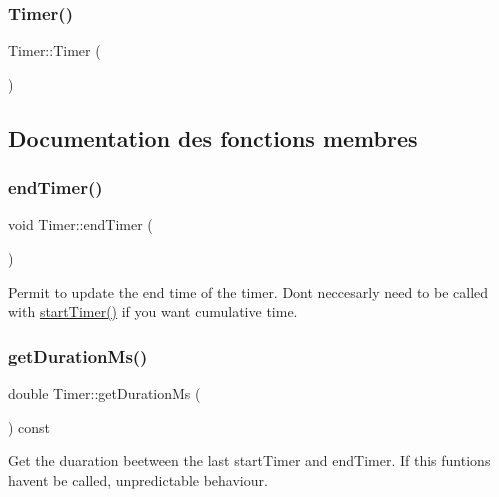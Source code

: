 \subsubsection{\texorpdfstring{Timer()}{Timer()}}
{\footnotesize\ttfamily Timer\+::\+Timer (\begin{DoxyParamCaption}{ }\end{DoxyParamCaption})\hspace{0.3cm}{\ttfamily [default]}}



\subsection{Documentation des fonctions membres}
\mbox{\label{class_timer_aef101eede3d1689a55f25f7164ecafcd}} 
\subsubsection{\texorpdfstring{end\+Timer()}{endTimer()}}
{\footnotesize\ttfamily void Timer\+::end\+Timer (\begin{DoxyParamCaption}{ }\end{DoxyParamCaption})\hspace{0.3cm}{\ttfamily [inline]}}



Permit to update the end time of the timer. Don\textquotesingle{}t neccesarly need to be called with \hyperlink{class_timer_aa8c887576ec3b0d68c10ebf4097c367c}{start\+Timer()} if you want cumulative time. 

\mbox{\label{class_timer_a70eb18ad272faecc82c376c590d1ae4a}} 
\subsubsection{\texorpdfstring{get\+Duration\+Ms()}{getDurationMs()}}
{\footnotesize\ttfamily double Timer\+::get\+Duration\+Ms (\begin{DoxyParamCaption}{ }\end{DoxyParamCaption}) const\hspace{0.3cm}{\ttfamily [inline]}}



Get the duaration beetween the last start\+Timer and end\+Timer. If this funtions haven\textquotesingle{}t be called, unpredictable behaviour. 

